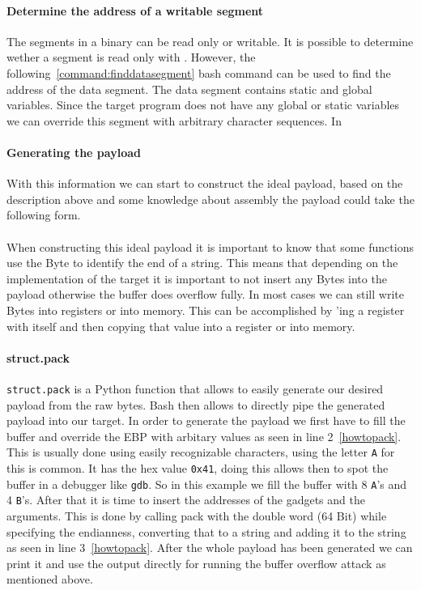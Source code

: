 \documentclass[journal=tosc,submission, notanonymous]{iacrtrans}
\begin{document}
\paragraph{Determine the address of a writable segment}
The segments in a binary can be read only or writable. It is possible to determine wether a segment is read only with . However, the following~\cref{command:finddatasegment} bash command can be used to find the address of the data segment. The data segment contains static and global variables. Since the target program does not have any global or static variables we can override this segment with arbitrary character sequences. In 
\paragraph{Generating the payload}
With this information we can start to construct the ideal payload, based on the description above and some knowledge about assembly the payload could take the following form. \\
 \\
When constructing this ideal payload it is important to know that some  functions use the  Byte to identify the end of a string. This means that depending on the implementation of the target it is important to not insert any  Bytes into the payload otherwise the buffer does overflow fully. In most cases we can still write  Bytes into registers or into memory. This can be accomplished by 'ing a register with itself and then copying that value into a register or into memory.
\paragraph{struct.pack}
\Verb+struct.pack+ is a Python function that allows to easily generate our desired payload from the raw bytes. Bash then allows to directly pipe the generated payload into our target. In order to generate the payload we first have to fill the buffer and override the EBP with arbitary values as seen in line 2~\cref{howtopack}. This is usually done using easily recognizable characters, using the letter \Verb+A+ for this is common. It has the hex value \Verb+0x41+, doing this allows then to spot the buffer in a debugger like \Verb+gdb+. So in this example we fill the buffer with 8 \Verb+A+'s and 4 \Verb+B+'s. After that it is time to insert the addresses of the gadgets and the arguments. This is done by calling pack with the double word (64 Bit) while specifying the endianness, converting that to a string and adding it to the string as seen in line 3~\cref{howtopack}. After the whole payload has been generated we can print it and use the output directly for running the buffer overflow attack as mentioned above.
\end{document}

